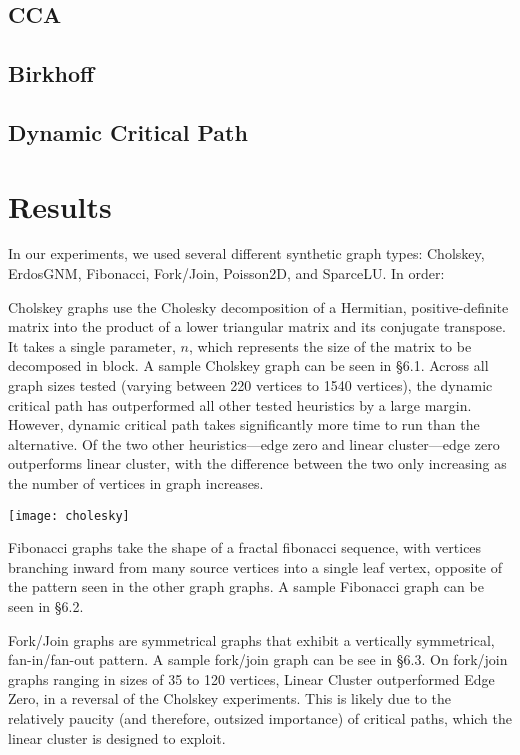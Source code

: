 \documentclass[11pt, oneside]{article}   	%
\begin{document}
\subsection{CCA}
\subsection{Birkhoff}
\subsection{Dynamic Critical Path}

\section{Results}

In our experiments, we used several different synthetic graph types: Cholskey, ErdosGNM, Fibonacci, Fork/Join, Poisson2D, and SparceLU. In order:

Cholskey graphs use the Cholesky decomposition of a Hermitian, positive-definite matrix into the product of a lower triangular matrix and its conjugate transpose. It takes a single parameter, $n$, which represents the size of the matrix to be decomposed in block. A sample Cholskey graph can be seen in \S 6.1. Across all graph sizes tested (varying between 220 vertices to 1540 vertices), the dynamic critical path has outperformed all other tested heuristics by a large margin. However, dynamic critical path takes significantly more time to run than the alternative. Of the two other heuristics---edge zero and linear cluster---edge zero outperforms linear cluster, with the difference between the two only increasing as the number of vertices in graph increases.
	
\texttt{[image: cholesky]}
	
Fibonacci graphs take the shape of a fractal fibonacci sequence, with vertices branching inward from many source vertices into a single leaf vertex, opposite of the pattern seen in the other graph graphs. A sample Fibonacci graph can be seen in \S 6.2.
	
Fork/Join graphs are symmetrical graphs that exhibit a vertically symmetrical, fan-in/fan-out pattern. A sample fork/join graph can be see in \S 6.3. On fork/join graphs ranging in sizes of 35 to 120 vertices, Linear Cluster outperformed Edge Zero, in a reversal of the Cholskey experiments. This is likely due to the relatively paucity (and therefore, outsized importance) of critical paths, which the linear cluster is designed to exploit.
	
\end{document}
